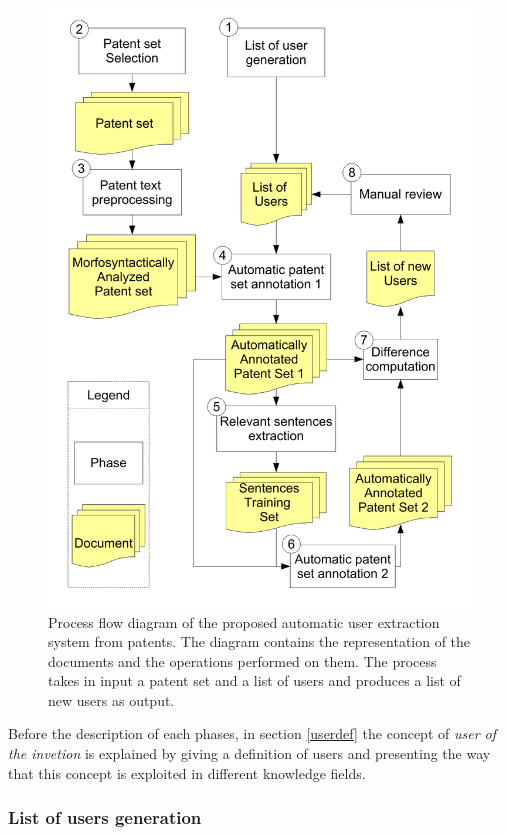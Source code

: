 \documentclass[]{book}
\begin{document}
\begin{figure}

{\centering \includegraphics[width=0.8\linewidth]{_bookdown_files/figures/Process} 

}

\caption{Process flow diagram of the proposed automatic user extraction system from patents. The diagram contains the representation of the documents and the operations performed on them. The process takes in input a patent set and a list of users and produces a list of new users as output.}\label{fig:procesuser}
\end{figure}

Before the description of each phases, in section \ref{userdef} the
concept of \emph{user of the invetion} is explained by giving a
definition of users and presenting the way that this concept is
exploited in different knowledge fields.

\subsubsection*{List of users
generation}\label{list-of-users-generation}
\end{document}
